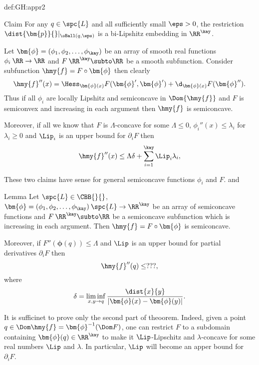 {\begin{subthm}{def:GH:appr2}
\begin{clm}{Claim}
For any $q\in\spc{L}$ and all sufficiently small $\eps>0$, 
the restriction $\dist{\bm{p}}{}|_{\oBall(q,\eps)}$ is a bi-Lipshitz embedding in $\RR^\kay$.
\end{clm}
\qeds























Let $\bm{\phi}=(\phi_1,\phi_2,\dots,\phi_\kay)$ be an array of smooth real functions $\phi_i\:\RR\to\RR$ and $F\:\RR^\kay\subto\RR$ be a smooth subfunction.
Consider subfunction $\hmy{f}=F\circ\bm{\phi}$ then clearly
$$\hmy{f}''(x)
=
\Hess_{\bm{\phi}(x)}F(\bm{\phi}',\bm{\phi}')
+
\d_{\bm{\phi}(x)}F(\bm{\phi}'').$$ 
Thus if all $\phi_i$ are locally Lipshitz and semiconcave in $\Dom{\hmy{f}}$ and 
$F$ is semiconvex and increasing in each argument then $\hmy{f}$ is semiconcave.

Moreover, if all we know that $F$ is $\Lambda$-concave for some $\Lambda\le 0$, $\phi_i''(x)\le\lambda_i$ for $\lambda_i\ge 0$ and $\Lip_i$ is an upper bound for $\partial_iF$ then 
$$\hmy{f}''(x)
\le
\Lambda\delta
+
\sum_{i=1}^\kay\Lip_i\lambda_i,$$

These two claims have sense for general semiconcave functions $\phi_i$ and $F$. and 
 

\begin{thm}{Lemma}
Let $\spc{L}\in \CBB{}{}$,
$\bm{\phi}=(\phi_1,\phi_2,\dots,\phi_\kay)\:\spc{L}\to\RR^\kay$
be an array of semiconcave functions and $F\:\RR^\kay\subto\RR$ be a semiconcave subfunction which is increasing in each argument.
Then $\hmy{f}=F\circ\bm{\phi}$ is semiconcave.

Moreover, if $F''(\bm{\phi}(q))\le \Lambda$ and $\Lip$ is an upper bound for partial derivatives $\partial_iF$ then
$$\hmy{f}''(q)\le ???,$$
where 
$$\delta=\liminf_{x,y\to q}\frac{\dist{x}{y}}{|\bm{\phi}(x)-\bm{\phi}(y)|}.$$

\end{thm}

It is sufficinet to prove only the 
second part of theoorem. 
Indeed, given a point $q\in \Dom \hmy{f}=\bm{\phi}^{-1}(\Dom F)$, 
one can restrict $F$ to a subdomain containing $\bm{\phi}(q)\in\RR^\kay$ to make it $\Lip$-Lipschitz and $\lambda$-concave for some real numbers $\Lip$ and $\lambda$.
In particular, $\Lip$ will become an apper bound for $\partial_iF$.


\end{subthm}}
